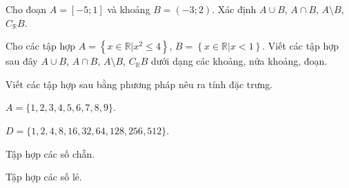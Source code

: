 \begin{bt}%
	Cho đoạn $A=[-5;1]$ và khoảng $B=(-3;2)$. Xác định $A\cup B$, $A\cap B$, $A\setminus B$, $C_{\mathbb{R}}B$.
	\loigiai{
		Ta có
		\begin{itemize}
			\item $A\cup B=[-5;2)$.
			\item $A\cap B=(-3;1]$.
			\item $A\setminus B=[-5;-3]$.
			\item $C_{\mathbb{R}}B=\mathbb{R}\setminus B=(-\infty;-3]\cup [2;+\infty)$.
		\end{itemize} 
	}
\end{bt}

\begin{bt}%
	Cho các tập hợp $A=\left\{x\in \mathbb{R}\big|x^2\leqslant 4\right\}$, $B=\left\{x\in \mathbb{R}\big|x<1\right\}$. Viết các tập hợp sau đây $A\cup B$, $A\cap B$, $A\setminus B$, $ C_{\mathbb{R}}B$ dưới dạng các khoảng, nửa khoảng, đoạn.
	\loigiai{
		Ta có $A=[-2;2]$ và $B=(-\infty;1)$, suy ra
		\begin{itemize}
			\item $A\cup B=[-2;2]\cup (-\infty;1)=(-\infty;2]$.
			\item $A\cap B=[-2;2]\cap (-\infty;1)=[-2;1)$.
			\item $A\setminus B=[-2;2]\setminus (-\infty;1)=[1;2]$.
			\item $C_{\mathbb{R}}B=[1;+\infty)$.
		\end{itemize}
	}
\end{bt}

\begin{bt}%
	Viết các tập hợp sau bằng phương pháp nêu ra tính đặc trưng.
	\begin{enumEX}{2}
		\item $ A=\{1,2,3,4,5,6,7,8,9 \} $.%
		\item $ D=\{1,2,4,8,16,32,64,128,256,512\} $.%
		\item Tập hợp các số chẵn.%
		\item Tập hợp các số lẻ.%
	\end{enumEX}
\end{bt}

